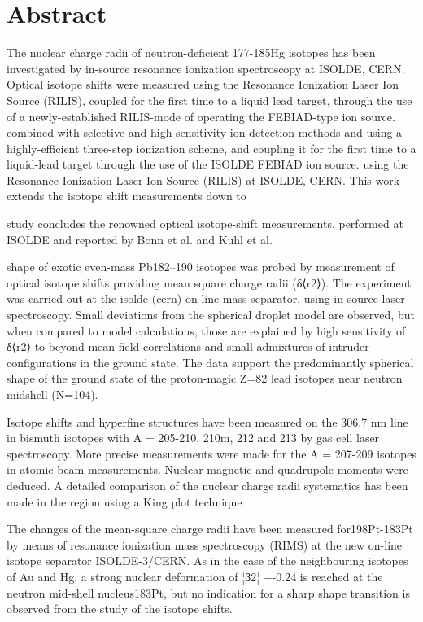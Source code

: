 \section{Abstract}
The nuclear charge radii of neutron-deficient 177-185Hg isotopes has been investigated by in-source resonance ionization spectroscopy at ISOLDE, CERN.  Optical isotope shifts were measured using the Resonance Ionization Laser Ion Source (RILIS), coupled for the first time to a liquid lead target, through the use of a newly-established RILIS-mode of operating the FEBIAD-type ion source.  combined with selective and high-sensitivity ion detection methods  and  using a highly-efficient three-step ionization scheme, and coupling it for the first time to a liquid-lead target through the use of the ISOLDE FEBIAD ion source.  using the Resonance Ionization Laser Ion Source (RILIS) at ISOLDE, CERN.  This work extends  the isotope shift measurements down to 

study concludes the renowned optical isotope-shift measurements, performed at ISOLDE and reported by Bonn et al. and Kuhl et al.

shape of exotic even-mass Pb182–190 isotopes was probed by measurement of optical isotope shifts providing mean square charge radii (δ⟨r2⟩). The experiment was carried out at the isolde (cern) on-line mass separator, using in-source laser spectroscopy. Small deviations from the spherical droplet model are observed, but when compared to model calculations, those are explained by high sensitivity of δ⟨r2⟩ to beyond mean-field correlations and small admixtures of intruder configurations in the ground state. The data support the predominantly spherical shape of the ground state of the proton-magic Z=82 lead isotopes near neutron midshell (N=104).


Isotope shifts and hyperfine structures have been measured on the 306.7 nm line in bismuth isotopes with A = 205-210, 210m, 212 and 213 by gas cell laser spectroscopy. More precise measurements were made for the A = 207-209 isotopes in atomic beam measurements. Nuclear magnetic and quadrupole moments were deduced. A detailed comparison of the nuclear charge radii systematics has been made in the region using a King plot technique

The changes of the mean-square charge radii have been measured for198Pt-183Pt by means of resonance ionization mass spectroscopy (RIMS) at the new on-line isotope separator ISOLDE-3/CERN. As in the case of the neighbouring isotopes of Au and Hg, a strong nuclear deformation of ¦β2¦ −-0.24 is reached at the neutron mid-shell nucleus183Pt, but no indication for a sharp shape transition is observed from the study of the isotope shifts.